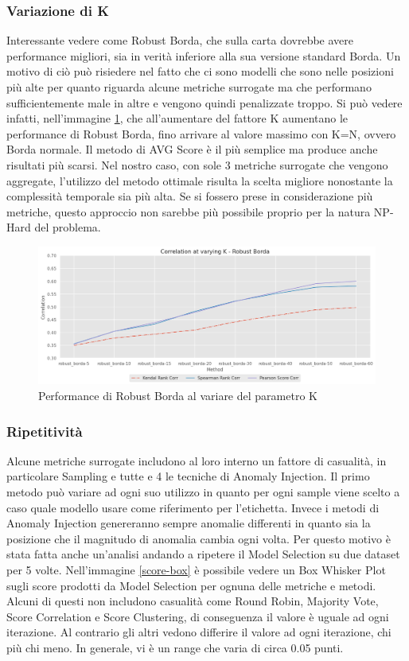 \newpage
\subsubsection{Variazione di K}
Interessante vedere come Robust Borda, che sulla carta dovrebbe avere performance migliori, sia in verità inferiore alla sua versione standard Borda. Un motivo di ciò può risiedere nel fatto che ci sono modelli che sono nelle posizioni più alte per quanto riguarda alcune metriche surrogate ma che performano sufficientemente male in altre e vengono quindi penalizzate troppo.
Si può vedere infatti, nell'immagine \ref{varying-k}, che all'aumentare del fattore K aumentano le performance di Robust Borda, fino arrivare al valore massimo con K=N, ovvero Borda normale.
Il metodo di AVG Score è il più semplice ma produce anche risultati più scarsi. Nel nostro caso, con sole 3 metriche surrogate che vengono aggregate, l'utilizzo del metodo ottimale risulta la scelta migliore nonostante la complessità temporale sia più alta. Se si fossero prese in considerazione più metriche, questo approccio non sarebbe più possibile proprio per la natura NP-Hard del problema.

\begin{figure}[t]
	\centering
	\includegraphics[width=14cm, scale=1]{images/varying-k}
	\caption{Performance di Robust Borda al variare del parametro K}
	\label{varying-k}
		
\end{figure}

\subsubsection{Ripetitività}
Alcune metriche surrogate includono al loro interno un fattore di casualità, in particolare Sampling e tutte e 4 le tecniche di Anomaly Injection. Il primo metodo può variare ad ogni suo utilizzo in quanto per ogni sample viene scelto a caso quale modello usare come riferimento per l'etichetta. Invece i metodi di Anomaly Injection genereranno sempre anomalie differenti in quanto sia la posizione che il magnitudo di anomalia cambia ogni volta.
Per questo motivo è stata fatta anche un'analisi andando a ripetere il Model Selection su due dataset per 5 volte.
Nell'immagine \ref{score-box}  è possibile vedere un Box Whisker Plot sugli score prodotti da Model Selection per ognuna delle metriche e metodi. Alcuni di questi non includono casualità come Round Robin, Majority Vote, Score Correlation e Score Clustering, di conseguenza il valore è uguale ad ogni iterazione. Al contrario gli altri vedono differire il valore ad ogni iterazione, chi più chi meno. In generale, vi è un range che varia di circa 0.05 punti.

